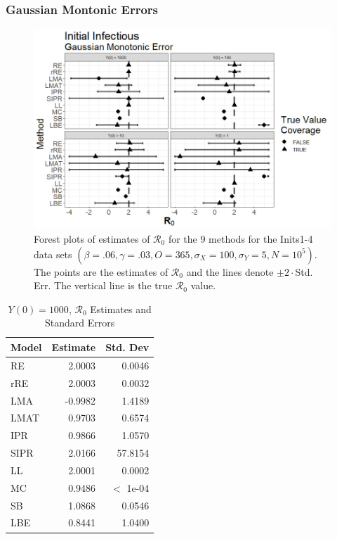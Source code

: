 \documentclass[12pt]{article}
\newcommand{\xxsir}{\ensuremath{9} } %
\newcommand{\rr}{\ensuremath{\mathcal{R}_0}}
\begin{document}
\subsubsection{Gaussian Montonic Errors}

\begin{figure}[H]
	\centering
	\includegraphics[scale=0.5]{images/start_nm.jpg}
	\caption{Forest plots of estimates of $\rr$ for the \xxsir methods for the Inits1-4 data sets $(\beta=.06, \gamma=.03, O=365, \sigma_X=100, \sigma_Y=5, N=10^5)$.  The points are the estimates of $\rr$ and the lines denote $\pm 2\cdot $Std. Err.  The vertical line is the true $\rr$ value.}
\end{figure}


\begin{table}[H]
	
	\centering
	\begin{tabular}[t]{l|r|r}
		\hline
		Model & Estimate & Std. Dev\\
		\hline
		RE & 2.0003 & 0.0046\\
		\hline
		rRE & 2.0003 & 0.0032\\
		\hline
		LMA & -0.9982 & 1.4189\\
		\hline
		LMAT & 0.9703 & 0.6574\\
		\hline
		IPR & 0.9866 & 1.0570\\
		\hline
		SIPR & 2.0166 & 57.8154\\
		\hline
		LL & 2.0001 & 0.0002\\
		\hline
		MC & 0.9486 & $<$ 1e-04\\
		\hline
		SB & 1.0868 & 0.0546\\
		\hline
		LBE & 0.8441 & 1.0400\\
		\hline
	\end{tabular}
	\caption{$Y(0) = 1000$, $\rr$ Estimates and Standard Errors}
\end{table}
\end{document}
